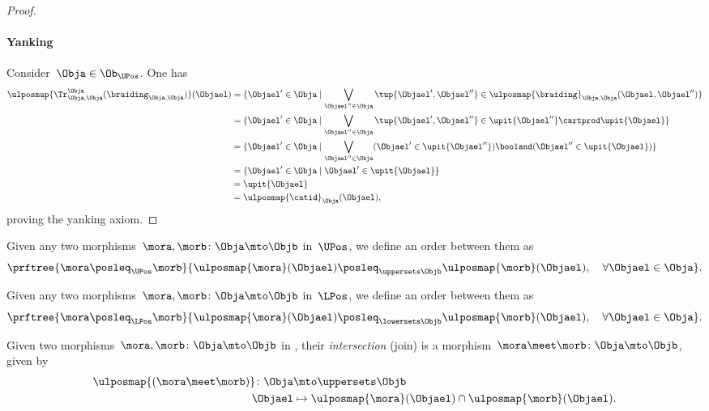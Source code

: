 \begin{proof}
\paragraph*{Yanking}
Consider~$\Obja\in \Ob_{\UPos}$.
One has
\begin{equation*}
\begin{aligned}
\ulposmap{\Tr_{\Obja,\Obja}^{\Obja}(\braiding_{\Obja,\Obja})}(\Objael)&=\{ \Objael'\in \Obja \mid \bigvee_{\Objael''\in \Obja}\tup{\Objael',\Objael''}\in \ulposmap{\braiding}_{\Obja,\Obja}(\Objael,\Objael'')\}\\
&=\{ \Objael'\in \Obja \mid \bigvee_{\Objael''\in \Obja}\tup{\Objael',\Objael''}\in \upit\{\Objael''\}\cartprod \upit\{ \Objael\}\}\\
&=\{ \Objael'\in \Obja \mid \bigvee_{\Objael''\in \Obja} (\Objael'\in \upit\{\Objael''\}) \booland(\Objael'' \in \upit\{ \Objael\})\}\\
&=\{ \Objael'\in \Obja \mid \Objael'\in \upit\{\Objael\}\}\\
&=\upit \{\Objael\}\\
&=\ulposmap{\catid}_\Obja(\Objael),
\end{aligned}
\end{equation*}
proving the yanking axiom.
\end{proof}


\begin{definition}
\label{def:upos_order}
Given any two morphisms~$\mora,\morb\colon \Obja \mto \Objb$ in~$\UPos$, we define an order between them as
\begin{equation*}
\prftree{\mora \posleq_\UPos \morb}{\ulposmap{\mora}(\Objael)\posleq_{\uppersets \Objb} \ulposmap{\morb}(\Objael), \quad \forall \Objael \in \Obja}.
\end{equation*}
\end{definition}

\begin{definition}
\label{def:lpos_order}
Given any two morphisms~$\mora,\morb\colon \Obja \mto \Objb$ in~$\LPos$, we define an order between them as
\begin{equation*}
\prftree{\mora \posleq_\LPos \morb}{\ulposmap{\mora}(\Objael)\posleq_{\lowersets \Objb} \ulposmap{\morb}(\Objael), \quad \forall \Objael \in \Obja}.
\end{equation*}
\end{definition}


\begin{definition}
Given two morphisms~$\mora,\morb\colon \Obja \mto \Objb$ in \UPos, their \emph{intersection} (join) is a morphism~$\mora \meet \morb \colon \Obja \mto \Objb$, given by
\begin{equation*}
\begin{aligned}
\ulposmap{(\mora \meet \morb)}\colon \Obja &\mto \uppersets \Objb\\
\Objael&\mapsto \ulposmap{\mora}(\Objael) \cap \ulposmap{\morb}(\Objael).
\end{aligned}
\end{equation*}
\end{definition}


